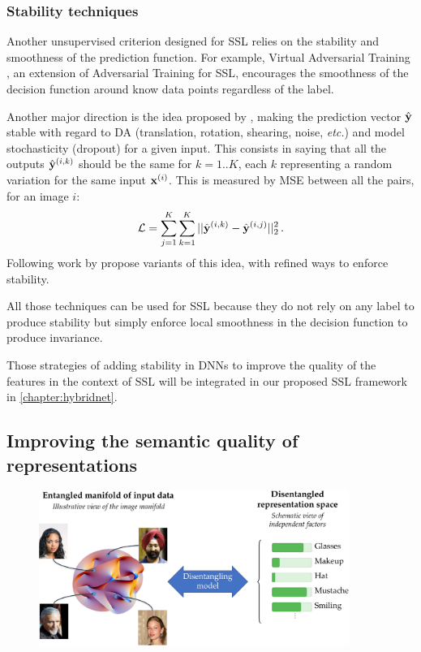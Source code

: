 \subsubsection{Stability techniques}  \label{shade:sec:RW_SSL_stab}

Another unsupervised criterion designed for \ac{SSL} relies on the stability and smoothness of the prediction function. For example, Virtual Adversarial Training \citep{miyato2015distributional}, an extension of Adversarial Training \citep{goodfellow2014explaining} for \ac{SSL}, encourages the smoothness of the decision function around know data points regardless of the label.

Another major direction is the idea proposed by \citet{Sajjadi2016}, making the prediction vector $\hat{\mathbf{y}}$ stable with regard to \ac{DA} (translation, rotation, shearing, noise, \textit{etc.}) and model stochasticity (dropout) for a given input. This consists in saying that all the outputs $\hat{\mathbf{y}}^{(i,k)}$ should be the same for $k=1..K$, each $k$ representing a random variation for the same input $\mathbf{x}^{(i)}$. This is measured by \ac{MSE} between all the pairs, for an image $i$:
\begin{equation}
  \mathcal{L} = \sum_{j=1}^K\sum_{k=1}^K||\hat{\mathbf{y}}^{(i,k)} - \hat{\mathbf{y}}^{(i,j)}||_2^2\,.
\end{equation}
Following work by \citet{Laine2016,Tarvainen2017} propose variants of this idea, with refined ways to enforce stability.

All those techniques can be used for \ac{SSL} because they do not rely on any label to produce stability but simply enforce local smoothness in the decision function to produce invariance.

Those strategies of adding stability in \acp{DNN} to improve the quality of the features in the context of \ac{SSL} will be integrated in our proposed \ac{SSL} framework in \autoref{chapter:hybridnet}.

\subsection{Improving the semantic quality of representations}

\begin{figure}[t]
    \centering
    \includegraphics[width=0.9\textwidth]{images/shade_disentangling}
    \label{shade:fig:disentangling}
\end{figure}

